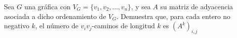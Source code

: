 Sea $G$ una gráfica con $V_G = \{v_1, v_2, \dots ,v_n\}$, y sea $A$ su
matriz de adyacencia asociada a dicho ordenamiento de $V_G$. Demuestra que, para
cada entero no negativo $k$, el número de $v_iv_j$-caminos de longitud $k$ es
$(A^k)_{i,j}$